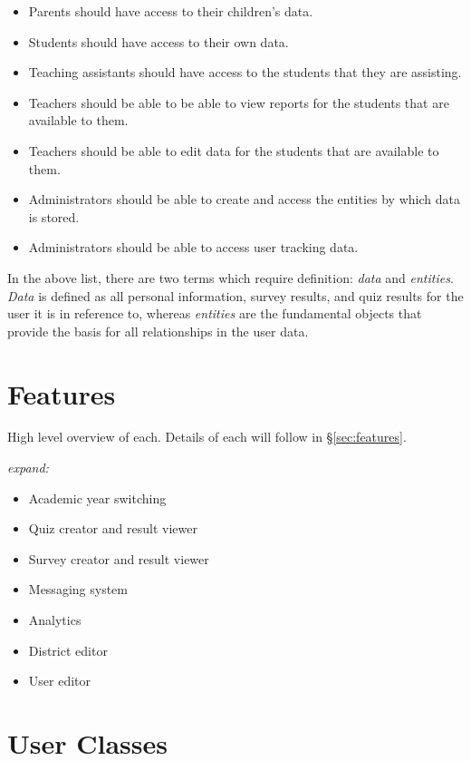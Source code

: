 \begin{itemize}
\item Parents should have access to their children's data.
\item Students should have access to their own data.
\item Teaching assistants should have access to the students that they are assisting.
\item Teachers should be able to be able to view reports for the students that are available to them.
\item Teachers should be able to edit data for the students that are available to them.
\item Administrators should be able to create and access the entities by which data is stored.
\item Administrators should be able to access user tracking data.
\end{itemize}

In the above list, there are two terms which require definition: \emph{data} and \emph{entities}. \emph{Data} is defined as all personal information, survey results, and quiz results for the user it is in reference to, whereas \emph{entities} are the fundamental objects that provide the basis for all relationships in the user data.


\section{Features}
\label{sec:overview-features}
High level overview of each. Details of each will follow in \S \ref{sec:features}.

\textit{expand:}

\begin{itemize}
	\item Academic year switching
	\item Quiz creator and result viewer
	\item Survey creator and result viewer
	\item Messaging system
	\item Analytics
	\item District editor
	\item User editor
\end{itemize}

\section{User Classes}
\label{sec:overview-user-classes}

